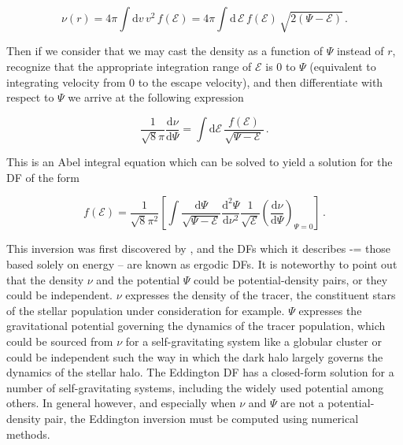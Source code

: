 \begin{equation}
    \label{ch1:eq:spherical-df-density}
    \nu(r) = 4\pi \int \mathrm{d} v \, v^{2} \, f(\mathcal{E}) = 4\pi \int \mathrm{d} \, \mathcal{E} \, f(\mathcal{E}) \, \sqrt{ 2(\Psi - \mathcal{E}) }\,.
\end{equation}

\noindent Then if we consider that we may cast the density as a function of $\Psi$ instead of $r$, recognize that the appropriate integration range of $\mathcal{E}$ is 0 to $\Psi$ (equivalent to integrating velocity from 0 to the escape velocity), and then differentiate with respect to $\Psi$ we arrive at the following expression

\begin{equation}
    \label{ch1:eq:spherical-df-density-derivative}
    \frac{1}{\sqrt{8}\pi} \frac{\mathrm{d} \nu}{\mathrm{d} \Psi} =  \int \mathrm{d} \mathcal{E} \, \frac{ f(\mathcal{E}) }{ \sqrt{\Psi - \mathcal{E}} }\,.
\end{equation}

\noindent This is an Abel integral equation which can be solved to yield a solution for the DF of the form

\begin{equation}
    \label{ch1:eq:eddington-inversion-df}
    f(\mathcal{E}) = \frac{1}{\sqrt{8}\pi^2} \left[ \int \frac{\mathrm{d} \Psi}{\sqrt{\Psi - \mathcal{E}}} \frac{\mathrm{d}^{2} \Psi}{\mathrm{d}\nu^{2}} \frac{1}{\sqrt{\mathcal{E}}} \left( \frac{\mathrm{d} \nu}{\mathrm{d} \Psi} \right)_{\Psi = 0} \right] \,.
\end{equation}

This inversion was first discovered by \textcite{eddington16}, and the DFs which it describes -= those based solely on energy -- are known as ergodic DFs. It is noteworthy to point out that the density $\nu$ and the potential $\Psi$ could be potential-density pairs, or they could be independent. $\nu$ expresses the density of the tracer, the constituent stars of the stellar population under consideration for example. $\Psi$ expresses the gravitational potential governing the dynamics of the tracer population, which could be sourced from $\nu$ for a self-gravitating system like a globular cluster or could be independent such the way in which the dark halo largely governs the dynamics of the stellar halo. The Eddington DF has a closed-form solution for a number of self-gravitating systems, including the widely used \textcite{hernquist90} potential among others. In general however, and especially when $\nu$ and $\Psi$ are not a potential-density pair, the Eddington inversion must be computed using numerical methods.


